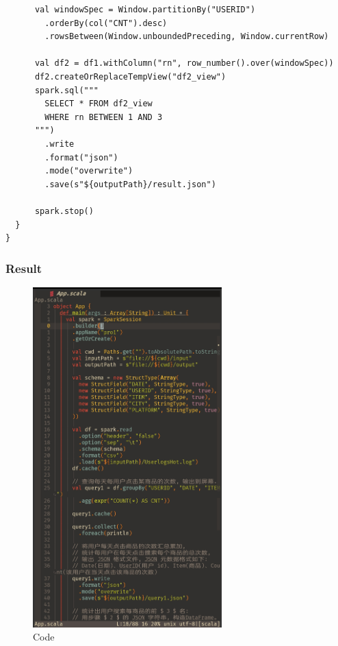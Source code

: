\documentclass{article}
\begin{document}
\begin{center}
\begin{verbatim}
      val windowSpec = Window.partitionBy("USERID")
        .orderBy(col("CNT").desc)
        .rowsBetween(Window.unboundedPreceding, Window.currentRow)

      val df2 = df1.withColumn("rn", row_number().over(windowSpec))
      df2.createOrReplaceTempView("df2_view")
      spark.sql("""
        SELECT * FROM df2_view
        WHERE rn BETWEEN 1 AND 3
      """)
        .write
        .format("json")
        .mode("overwrite")
        .save(s"${outputPath}/result.json")

      spark.stop()
  }
}
\end{verbatim}
\end{center}

\subsubsection{Result}
\begin{figure}[H]
  \begin{center}
    \includegraphics[width=0.65\textwidth]{./figures/1.jpg}
  \end{center}
  \caption{Code}
\end{figure}
\end{document}
